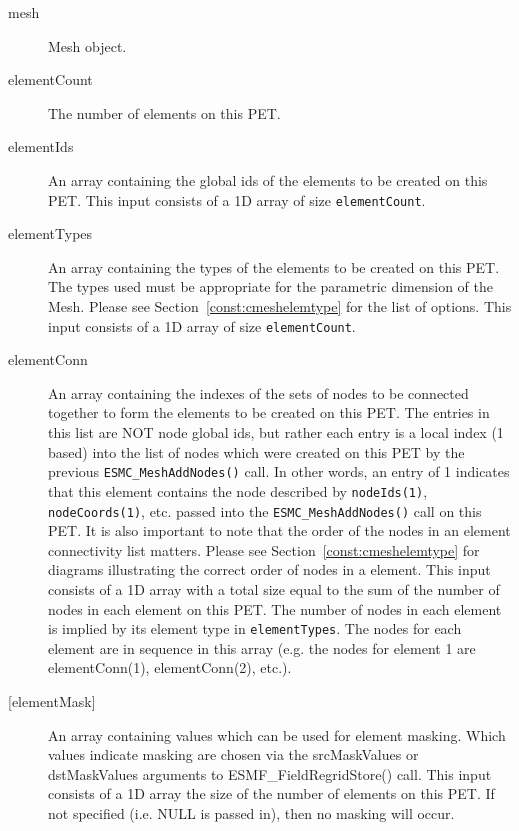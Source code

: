      \begin{description}
     \item[mesh]
            Mesh object.
     \item[elementCount]
            The number of elements on this PET.
     \item[elementIds]
            An array containing the global ids of the elements to be created on this PET.
            This input consists of a 1D array of size {\tt elementCount}.
     \item[elementTypes]
            An array containing the types of the elements to be created on this PET. The types used
            must be appropriate for the parametric dimension of the Mesh. Please see
            Section~\ref{const:cmeshelemtype} for the list of options. This
            input consists of a 1D array of size {\tt elementCount}.
     \item[elementConn]
           An array containing the indexes of the sets of nodes to be connected together to form the
           elements to be created on this PET. The entries in this list are NOT node global ids,
           but rather each entry is a local index (1 based) into the list of nodes which were
           created on this PET by the previous {\tt ESMC\_MeshAddNodes()} call.
           In other words, an entry of 1 indicates that this element contains the node
           described by {\tt nodeIds(1)}, {\tt nodeCoords(1)}, etc. passed into the
           {\tt ESMC\_MeshAddNodes()} call on this PET. It is also
           important to note that the order of the nodes in an element connectivity list
           matters. Please see Section~\ref{const:cmeshelemtype} for diagrams illustrating
           the correct order of nodes in a element. This input consists of a 1D array with
           a total size equal to the sum of the number of nodes in each element on
           this PET. The number of nodes in each element is implied by its element type in
           {\tt elementTypes}. The nodes for each element
           are in sequence in this array (e.g. the nodes for element 1 are elementConn(1),
           elementConn(2), etc.).
     \item[{[elementMask]}]
           An array containing values which can be used for element masking.
           Which values indicate masking are chosen via the srcMaskValues or
           dstMaskValues arguments to ESMF\_FieldRegridStore() call. This input
           consists of a 1D array the size of the number of elements on this
           PET. If not specified (i.e. NULL is passed in), then no masking will occur.

\end{description}
